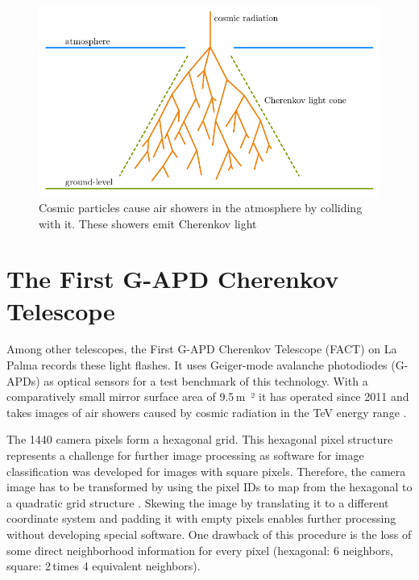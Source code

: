 \begin{figure}
    \centering
    \includegraphics[scale=1]{Plots/Air_Shower.pdf}
    \caption{Cosmic particles cause air showers in the atmosphere by colliding with it. These showers emit Cherenkov light}
    \label{fig:air_shower}
\end{figure}


\section{The First G-APD Cherenkov Telescope}
Among other telescopes, the First G-APD Cherenkov Telescope (FACT) on La Palma records these light flashes.
It uses Geiger-mode avalanche photodiodes (G-APDs) as optical sensors for a test benchmark of this technology.
With a comparatively small mirror surface area of \num{9.5}\,\si{\meter²} it has operated since \num{2011}
and takes images of air showers caused by cosmic radiation in the TeV energy range \cite{FACT}.

The \num{1440} camera pixels form a hexagonal grid.
This hexagonal pixel structure represents a challenge for further image processing
as software for image classification was developed for images with square pixels.
Therefore, the camera image has to be transformed by using the pixel IDs
to map from the hexagonal to a quadratic grid structure \cite{hexagonal}.
Skewing the image by translating it to a different coordinate system and padding it with empty pixels
enables further processing without developing special software.
One drawback of this procedure is the loss of some direct neighborhood information for every pixel
(hexagonal: \num{6} neighbors, square: \num{2}\,times \num{4} equivalent neighbors).

